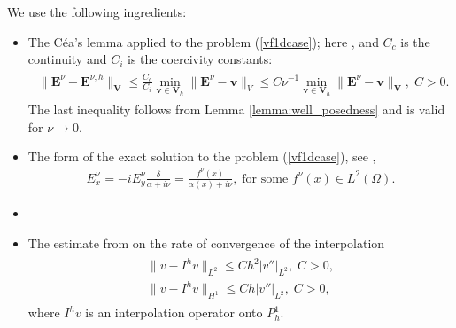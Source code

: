 We use the following ingredients:
\begin{itemize}
 \item The C\'ea's lemma applied to the problem (\ref{vf1dcase}); here , and $C_c$ is the continuity and $C_i$ is the coercivity constants:
\begin{align}
\label{eq:cea}
\begin{split}
 \|\mathbf{E}^{\nu}-\mathbf{E}^{\nu,h}\|_{\mathbf{V}}\leq \frac{C_c}{C_i}\min_{\mathbf{v}\in \mathbf{V}_h}\|\mathbf{E}^{\nu}-\mathbf{v}\|_{V}
 \leq C\nu^{-1}\min_{\mathbf{v}\in \mathbf{V}_h}\|\mathbf{E}^{\nu}-\mathbf{v}\|_{\mathbf{V}},\; C>0.
 \end{split}
\end{align}
The last inequality follows from Lemma \ref{lemma:well_posedness} and is valid for $\nu\rightarrow 0$.   
\item The form of the exact solution to the problem (\ref{vf1dcase}), see \cite{Despres_2014},
\begin{align}
\label{eq:exact}
 E_x^{\nu}=-iE_{y}^{\nu}\frac{\delta}{\alpha+i\nu}=\frac{f^{\nu}(x)}{\alpha(x)+i\nu}, \; \text{for some }f^{\nu}(x)\in L^2(\Omega).
\end{align}
\item {}
\item The estimate from \cite[Chapter 0]{brenner} on the rate of convergence of the interpolation 
\begin{align}
\label{eq:interp}
\begin{split}
 \|v-I^{h}v\|_{L^2}\leq Ch^2\left|v''\right|_{L^2},\; C>0,\\
 \|v-I^{h}v\|_{H^1}\leq Ch|v''|_{L^2},\; C>0, 
 \end{split}
\end{align}
where $I^{h}v$ is an interpolation operator onto $P_{h}^{1}$. 
\end{itemize}
